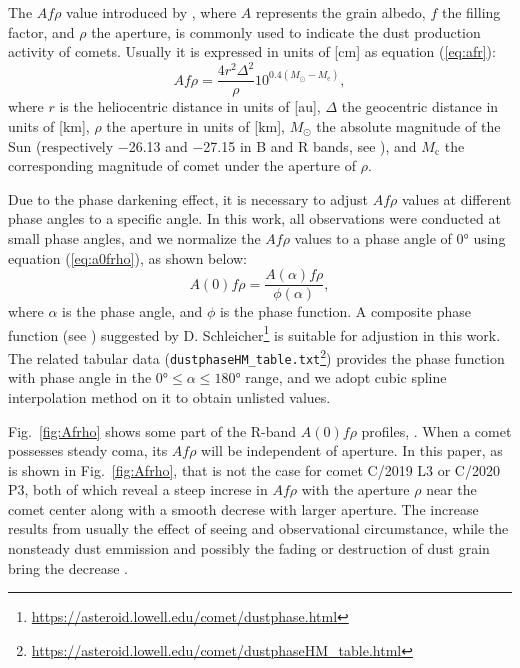 The $Af\rho$ value introduced by \citet{ahearn_comet_1984}, where $A$ represents the grain albedo, $f$ the filling factor, and $\rho$ the aperture, is commonly used to indicate the dust production activity of comets. Usually it is expressed in units of [\unit{\cm}] as equation (\ref{eq:afr}): 
\begin{equation}
    Af\rho = \frac{4 r^2 \Delta^2}{\rho} 10^{0.4(M_\odot - M_\mathrm{c})}, 
    \label{eq:afr}
\end{equation}
where $r$ is the heliocentric distance in units of [\unit{\astronomicalunit}], $\Delta$ the geocentric distance in units of [\unit{\km}], $\rho$ the aperture in units of [\unit{\km}], $M_\odot$ the absolute magnitude of the Sun (respectively \num{-26.13} and \num{-27.15} in B and R bands, see \citealt{willmer_absolute_2018}), and $M_\mathrm{c}$ the corresponding magnitude of comet under the aperture of $\rho$. 

Due to the phase darkening effect, it is necessary to adjust $Af\rho$ values at different phase angles to a specific angle. In this work, all observations were conducted at small phase angles, and we normalize the $Af\rho$ values to a phase angle of \ang{0} using equation (\ref{eq:a0frho}), as shown below:
\begin{equation}
    A(0)f\rho = \frac{A(\alpha)f\rho}{\phi(\alpha)}, \label{eq:a0frho}
\end{equation}
where $\alpha$ is the phase angle, and $\phi$ is the phase function. A composite phase function (see \citealt{schleicher_composition_2011, marcus_forward-scattering_2007}) suggested by D. Schleicher\footnote{\url{https://asteroid.lowell.edu/comet/dustphase.html}} is suitable for adjustion in this work. The related tabular data (\verb|dustphaseHM_table.txt|\footnote{\url{https://asteroid.lowell.edu/comet/dustphaseHM_table.html}}) provides the phase function with phase angle in the $\ang{0} \leqslant \alpha \leqslant \ang{180}$ range, and we adopt cubic spline interpolation method on it to obtain unlisted values. 

Fig.~\ref{fig:Afrho} shows some part of the R-band $A(0)f\rho$ profiles, . When a comet possesses steady coma, its $Af\rho$ will be independent of aperture. In this paper, as is shown in Fig.~\ref{fig:Afrho}, that is not the case for comet C/2019 L3 or C/2020 P3, both of which reveal a steep increse in $Af\rho$ with the aperture $\rho$ near the comet center along with a smooth decrese with larger aperture. The increase results from usually the effect of seeing and observational circumstance, while the nonsteady dust emmission and possibly the fading or destruction of dust grain bring the decrease \citep{lara_behaviour_2003,tozzi_imaging_2003}.  

